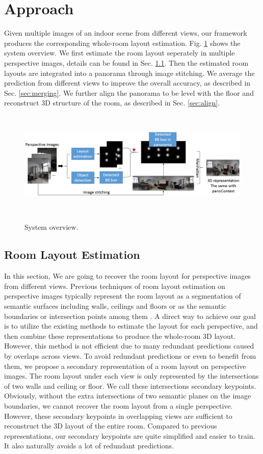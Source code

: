 \section{Approach}
Given multiple images of an indoor scene from different views, our framework produces the corresponding whole-room layout estimation. Fig. \ref{fig:overview} shows the system overview. We first estimate the room layout seperately in multiple perspective images, details can be found in Sec. \ref{sec:layout}. Then the estimated room layouts are integrated into a panorama through image stitching. We average the prediction from different views to improve the overall accuracy, as described in Sec. \ref{sec:merging}. We further align the panorama to be level with the floor and reconstruct 3D structure of the room, as described in Sec. \ref{sec:align}. 

\begin{figure}
	\includegraphics[height=2in, width=6in]{figs/ppline.png}
	\label{fig:overview}
	\caption{System overview.}
\end{figure}

\subsection{Room Layout Estimation}
\label{sec:layout}
In this section, We are going to recover the room layout for perspective images from different views. Previous techniques of room layout estimation on perspective images typically represent the room layout as a segmentation of semantic surfaces including walls, ceilings and floors \cite{Delay,ours} or as the semantic boundaries or intersection points among them \cite{CFILE}. A direct way to achieve our goal is to utilize the existing methods to estimate the layout for each perspective, and then combine these representations to produce the whole-room 3D layout. However, this method is not efficient due to many redundant predictions caused by overlaps across views. To avoid redundant predictions or even to benefit from them, we propose a secondary representation of a room layout on perspective images. The room layout under each view is only represented by the intersections of two walls and ceiling or floor. We call these intersections secondary keypoints. Obviously, without the extra intersections of two semantic planes on the image boundaries, we cannot recover the room layout from a single perspective. However, these secondary keypoints in overlapping views are sufficient to reconstruct the 3D layout of the entire room. Compared to previous representations, our secondary keypoints are quite simplified and easier to train. It also naturally avoids a lot of redundant predictions. 
 
